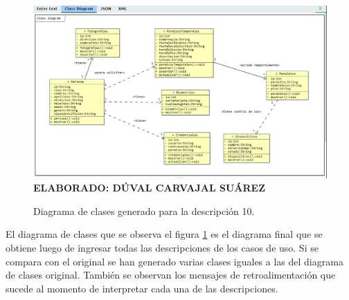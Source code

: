 \begin{figure}[H]
	\caption{Diagrama de clases generado para la descripción 10.}
	\includegraphics[width=15cm]{img/dc-eva-011.png}
	\label{fig:dc_eva_011}
	\textbf{\\ ELABORADO: DÚVAL CARVAJAL SUÁREZ}
\end{figure}

El diagrama de clases que se observa el figura \ref{fig:dc_eva_011} es el diagrama final que se obtiene luego de ingresar todas las descripciones de los casos de uso. Si se compara con el original se han generado varias clases iguales a las del diagrama de clases original. También se observan los mensajes de retroalimentación que sucede al momento de interpretar cada una de las descripciones.

